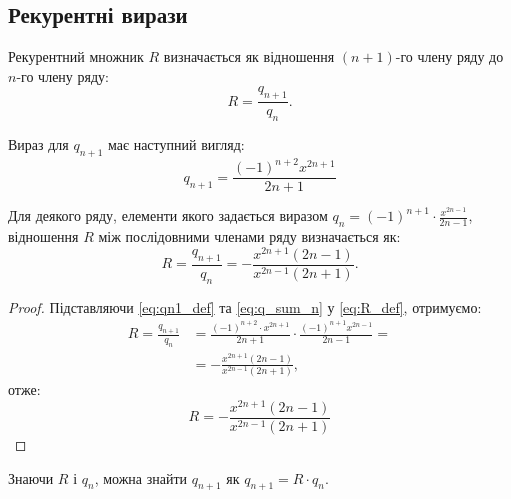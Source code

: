 	\subsection{Рекурентні вирази}
	
	\begin{definition}
		Рекурентний множник \( R \) визначається як відношення \( (n+1) \)-го члену ряду до \( n \)-го члену ряду:
		\begin{equation} \label{eq:R_def}
			R = \frac{q_{n+1}}{q_n}.
		\end{equation}
	\end{definition}
	
	\begin{definition}
		Вираз для \( q_{n+1} \) має наступний вигляд:
		\begin{equation} \label{eq:qn1_def}
			q_{n+1} = \frac{(-1)^{n+2} x^{2n+1}}{2n+1}
		\end{equation}
	\end{definition}
	
	\begin{theorem} \label{thm:ratio_test_result}
		Для деякого ряду, елементи якого задається виразом \(q_n = (-1)^{n+1} \cdot \frac{x^{2n-1}}{2n-1}\), відношення \(R\) між послідовними членами ряду визначається як:
		\[
		R = \frac{q_{n+1}}{q_n} = -\frac{x^{2n+1} (2n-1)}{x^{2n-1} (2n+1)}.
		\]
	\end{theorem}
	
	\begin{proof}
		Підставляючи \eqref{eq:qn1_def} та \eqref{eq:q_sum_n} у \eqref{eq:R_def}, отримуємо:
		\begin{align*}
			R = \frac{q_{n+1}}{q_n} &= 
			\frac{(-1)^{n+2} \cdot x^{2n+1}}{2n+1} \cdot \frac{(-1)^{n+1} x^{2n-1}}{2n-1}= \\
			&= -\frac{x^{2n+1} (2n-1)}{x^{2n-1} (2n+1)},
		\end{align*}
		отже:
	\begin{equation} \label{eq:R_simplified}
	R = -\frac{x^{2n+1} (2n-1)}{x^{2n-1} (2n+1)}
\end{equation}
	\end{proof}
	
	\begin{corollary}
		Знаючи \( R \) і \( q_n \), можна знайти \( q_{n+1} \) як \( q_{n+1} = R \cdot q_n \).
	\end{corollary}
	
	
	
	



	
	
	
